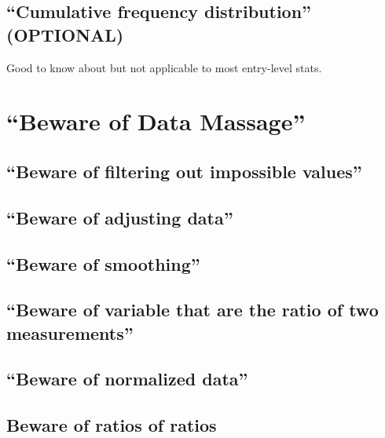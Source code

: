 \documentclass[]{book}
\theoremstyle{definition}
\theoremstyle{definition}
\theoremstyle{definition}
\theoremstyle{remark}
\begin{document}
\subsection{\texorpdfstring{``Cumulative frequency distribution''
(OPTIONAL)}{Cumulative frequency distribution (OPTIONAL)}}\label{cumulative-frequency-distribution-optional}

Good to know about but not applicable to most entry-level stats.

\section{\texorpdfstring{``Beware of Data
Massage''}{Beware of Data Massage}}\label{beware-of-data-massage}

\subsection{\texorpdfstring{``Beware of filtering out impossible
values''}{Beware of filtering out impossible values}}\label{beware-of-filtering-out-impossible-values}

\subsection{\texorpdfstring{``Beware of adjusting
data''}{Beware of adjusting data}}\label{beware-of-adjusting-data}

\subsection{\texorpdfstring{``Beware of
smoothing''}{Beware of smoothing}}\label{beware-of-smoothing}

\subsection{\texorpdfstring{``Beware of variable that are the ratio of
two
measurements''}{Beware of variable that are the ratio of two measurements}}\label{beware-of-variable-that-are-the-ratio-of-two-measurements}

\subsection{\texorpdfstring{``Beware of normalized
data''}{Beware of normalized data}}\label{beware-of-normalized-data}

\subsection*{Beware of ratios of
ratios}\label{beware-of-ratios-of-ratios}
\end{document}
